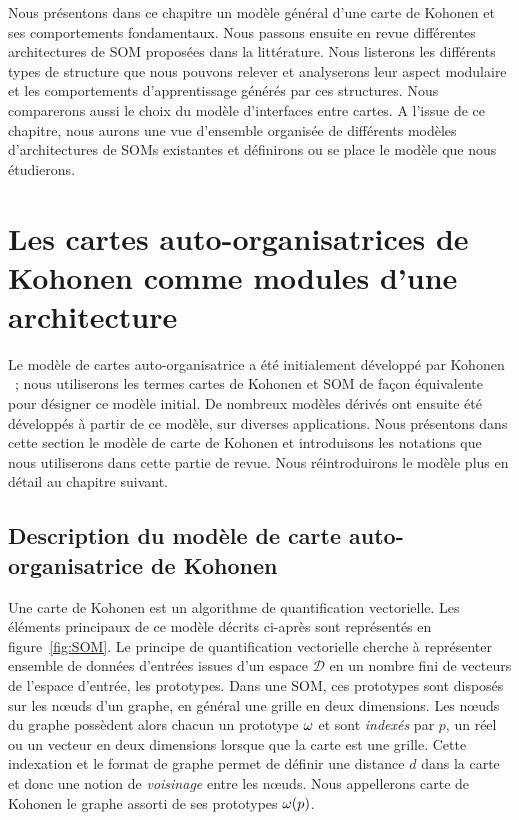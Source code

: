 \documentclass[../main]{subfiles}
\begin{document}
Nous présentons dans ce chapitre un modèle général d'une carte de Kohonen et ses comportements fondamentaux.
Nous passons ensuite en revue différentes architectures de SOM proposées dans la littérature. 
Nous listerons les différents types de structure que nous pouvons relever et analyserons leur aspect modulaire et les comportements d'apprentissage générés par ces structures.
Nous comparerons aussi le choix du modèle d'interfaces entre cartes.
A l'issue de ce chapitre, nous aurons une vue d'ensemble organisée de différents modèles d'architectures de SOMs existantes et définirons ou se place le modèle que nous étudierons.

\section{Les cartes auto-organisatrices de Kohonen comme modules d'une architecture}\label{sec:som001}

Le modèle de cartes auto-organisatrice a été initialement développé par Kohonen \cite{Kohonen1982}~; nous utiliserons les termes cartes de Kohonen et SOM de façon équivalente pour désigner ce modèle initial.
De nombreux modèles dérivés ont ensuite été développés à partir de ce modèle, sur diverses applications.
Nous présentons dans cette section le modèle de carte de Kohonen et introduisons les notations que nous utiliserons dans cette partie de revue. Nous réintroduirons le modèle plus en détail au chapitre suivant.

\subsection{Description du modèle de carte auto-organisatrice de Kohonen}

Une carte de Kohonen est un algorithme de quantification vectorielle. 
Les éléments principaux de ce modèle décrits ci-après sont représentés en figure~\ref{fig:SOM}.
Le principe de quantification vectorielle cherche à représenter ensemble de données d'entrées issues d'un espace $\mathcal{D}$ en un nombre fini de vecteurs de l'espace d'entrée, les prototypes.
Dans une SOM, ces prototypes sont disposés sur les n\oe{}uds d'un graphe, en général une grille en deux dimensions.
Les n\oe{}uds du graphe possèdent alors chacun un prototype $\omega$ et sont \emph{indexés} par $p$, un réel ou un vecteur en deux dimensions lorsque que la carte est une grille.
Cette indexation et le format de graphe permet de définir une distance $d$ dans la carte et donc une notion de \emph{voisinage} entre les n\oe{}uds. Nous appellerons carte de Kohonen le graphe assorti de ses prototypes $\omega(p)$.
\end{document}

